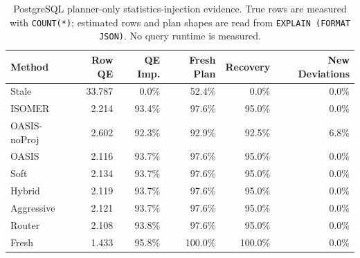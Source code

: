 \begin{table}[t]
  \centering
  \small
  \caption{PostgreSQL planner-only statistics-injection evidence. True rows are measured with \texttt{COUNT(*)}; estimated rows and plan shapes are read from \texttt{EXPLAIN (FORMAT JSON)}. No query runtime is measured.}
  \label{tab:postgres_planner_stats_injection}
  \setlength{\tabcolsep}{4pt}
  \begin{tabular}{lrrrrr}
    \toprule
    Method & Row QE & QE Imp. & Fresh Plan & Recovery & New Deviations \\
    \midrule
    Stale & 33.787 & 0.0\% & 52.4\% & 0.0\% & 0.0\% \\
    ISOMER & 2.214 & 93.4\% & 97.6\% & 95.0\% & 0.0\% \\
    OASIS-noProj & 2.602 & 92.3\% & 92.9\% & 92.5\% & 6.8\% \\
    OASIS & 2.116 & 93.7\% & 97.6\% & 95.0\% & 0.0\% \\
    Soft & 2.134 & 93.7\% & 97.6\% & 95.0\% & 0.0\% \\
    Hybrid & 2.119 & 93.7\% & 97.6\% & 95.0\% & 0.0\% \\
    Aggressive & 2.121 & 93.7\% & 97.6\% & 95.0\% & 0.0\% \\
    Router & 2.108 & 93.8\% & 97.6\% & 95.0\% & 0.0\% \\
    Fresh & 1.433 & 95.8\% & 100.0\% & 100.0\% & 0.0\% \\
    \bottomrule
  \end{tabular}
\end{table}

